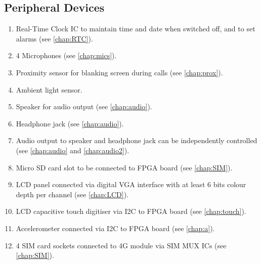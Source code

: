 \subsection{Peripheral Devices}
\begin{enumerate}
\item Real-Time Clock IC to maintain time and date when switched off, and to set alarms (see \autoref{chap:RTC}).
\item 4 Microphones (see \autoref{chap:mics}).
\item Proximity sensor for blanking screen during calls (see \autoref{chap:prox}).
\item Ambient light sensor.
\item Speaker for audio output (see \autoref{chap:audio}).
\item Headphone jack (see \autoref{chap:audio}).
\item Audio output to speaker and headphone jack can be independently controlled (see \autoref{chap:audio} and \autoref{chap:audio2}).
\item Micro SD card slot to be connected to FPGA board (see \autoref{chap:SIM}).
\item LCD panel connected via digital VGA interface with at least 6 bits colour depth per channel (see \autoref{chap:LCD}).
\item LCD capacitive touch digitiser via I2C to FPGA board (see \autoref{chap:touch}).
\item Accelerometer connected via I2C to FPGA board (see \autoref{chap:a}).
\item 4 SIM card sockets connected to 4G module via SIM MUX ICs (see \autoref{chap:SIM}).
\end{enumerate}




